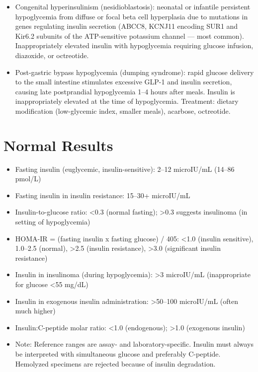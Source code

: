 \begin{itemize}
  \item Congenital hyperinsulinism (nesidioblastosis): neonatal or infantile persistent hypoglycemia from diffuse or focal beta cell hyperplasia due to mutations in genes regulating insulin secretion (ABCC8, KCNJ11 encoding SUR1 and Kir6.2 subunits of the ATP-sensitive potassium channel --- most common). Inappropriately elevated insulin with hypoglycemia requiring glucose infusion, diazoxide, or octreotide.
  \item Post-gastric bypass hypoglycemia (dumping syndrome): rapid glucose delivery to the small intestine stimulates excessive GLP-1 and insulin secretion, causing late postprandial hypoglycemia 1--4 hours after meals. Insulin is inappropriately elevated at the time of hypoglycemia. Treatment: dietary modification (low-glycemic index, smaller meals), acarbose, octreotide.
\end{itemize}

\section*{Normal Results}
\begin{itemize}
  \item Fasting insulin (euglycemic, insulin-sensitive): 2--12 microIU/mL (14--86 pmol/L)
  \item Fasting insulin in insulin resistance: 15--30+ microIU/mL
  \item Insulin-to-glucose ratio: <0.3 (normal fasting); >0.3 suggests insulinoma (in setting of hypoglycemia)
  \item HOMA-IR = (fasting insulin x fasting glucose) / 405: <1.0 (insulin sensitive), 1.0--2.5 (normal), >2.5 (insulin resistance), >3.0 (significant insulin resistance)
  \item Insulin in insulinoma (during hypoglycemia): >3 microIU/mL (inappropriate for glucose <55 mg/dL)
  \item Insulin in exogenous insulin administration: >50--100 microIU/mL (often much higher)
  \item Insulin:C-peptide molar ratio: <1.0 (endogenous); >1.0 (exogenous insulin)
  \item Note: Reference ranges are assay- and laboratory-specific. Insulin must always be interpreted with simultaneous glucose and preferably C-peptide. Hemolyzed specimens are rejected because of insulin degradation.
\end{itemize}

